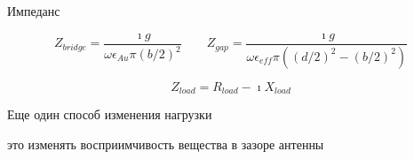 \documentclass[9pt, compress, xcolor=table]{beamer}
\begin{document}
\begin{frame}{Импеданс}
\begin{center}
\begin{equation*}
Z_{bridge}=\frac{\imath g}{\omega \epsilon_{Au}\pi (b/2)^2}\qquad Z_{gap}=\frac{\imath g}{\omega \epsilon_{eff}\pi ((d/2)^2-(b/2)^2)}
\end{equation*}

\begin{equation*}
Z_{load}=R_{load}-\imath X_{load}
\end{equation*}
\end{center}

\end{frame}

\begin{frame}{Еще один способ изменения нагрузки}

это изменять восприимчивость вещества в зазоре антенны 
 

\end{frame}
\end{document}
